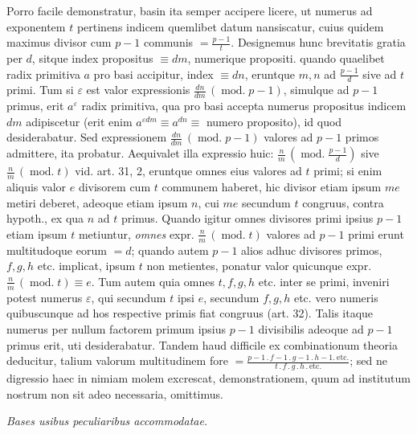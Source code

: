 
Porro facile demonstratur, basin ita semper accipere licere, ut numerus ad exponentem $t$ pertinens indicem quemlibet datum nansiscatur, cuius quidem maximus divisor cum $p-1$ communis $=\frac{p-1}{t}$. Designemus hunc brevitatis gratia per $d$, sitque index propositus $\equiv dm$, numerique propositi. quando quaelibet
radix primitiva $a$ pro basi accipitur, index $\equiv dn$, eruntque $m,n$ ad $\frac{p-1}{d}$ sive ad $t$ primi. Tum si $\varepsilon$ est valor expressionis $\frac{dn}{dm}\,(\operatorname{mod.}p-1)$, simulque ad $p-1$ primus, erit $a^\varepsilon$ radix primitiva, qua pro basi accepta numerus propositus indicem $dm$ adipiscetur (erit enim $a^{\varepsilon dm}\equiv a^{dn}\equiv$ numero proposito), id quod desiderabatur. Sed expressionem $\frac{dn}{dm}\,(\operatorname{mod.}p-1)$ valores ad $p-1$ primos admittere, ita probatur. Aequivalet illa expressio huic: $\frac{n}{m}\,(\operatorname{mod.}\frac{p-1}{d})$ sive $\frac{n}{m}\,(\operatorname{mod.}t)$ vid. art. 31, 2, eruntque omnes eius valores ad $t$ primi; si enim aliquis valor $e$ divisorem cum $t$ communem haberet, hic divisor etiam ipsum $me$ metiri deberet, adeoque etiam ipsum $n$, cui $me$ secundum $t$ congruus, contra hypoth., ex qua $n$ ad $t$ primus. Quando igitur omnes divisores primi ipsius $p-1$ etiam ipsum $t$ metiuntur, \emph{omnes} expr. $\frac{n}{m}\,(\operatorname{mod.}t)$ valores ad $p-1$ primi erunt multitudoque eorum $=d$; quando autem $p-1$ alios adhuc divisores primos, $f,g,h$ etc. implicat, ipsum $t$ non metientes, ponatur valor quicunque expr. $\frac{n}{m}\,(\operatorname{mod.}t)\equiv e$. Tum autem quia omnes $t,f,g,h$ etc. inter se primi, inveniri potest numerus $\varepsilon$, qui secundum $t$ ipsi $e$, secundum $f,g,h$ etc. vero numeris quibuscunque ad hos respective primis fiat congruus (art. 32). Talis itaque numerus per nullum factorem primum ipsius $p-1$ divisibilis adeoque ad $p-1$ primus erit, uti desiderabatur. Tandem haud difficile ex combinationum theoria deducitur, talium valorum multitudinem fore $=\frac{p-1\,.\,f-1\,.\,g-1\,.\,h-1.\ \mathrm{etc.}}{t\,.\,f\,.\,g\,.\,h\,.\,\mathrm{etc.}}$; sed ne digressio haec in nimiam molem excrescat, demonstrationem, quum ad institutum nostrum non sit adeo necessaria, omittimus.

\begin{center}\emph{Bases usibus peculiaribus accommodatae.}\end{center}


